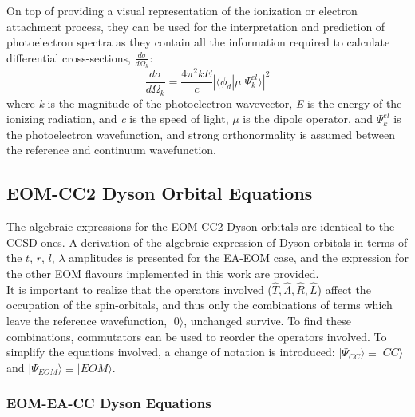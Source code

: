 On top of providing a visual representation of the ionization or electron attachment process, they can be used for the interpretation and prediction of photoelectron spectra as they contain all the information required to calculate differential cross-sections, $\displaystyle{\frac{d\sigma}{d\Omega_k}}$:
\begin{equation}
    \frac{d\sigma}{d\Omega_k} = \frac{4\pi^2kE}{c}|\langle \phi_d | \mu | \Psi^{el}_k \rangle |^2
\end{equation}
where \textit{k} is the magnitude of the photoelectron wavevector, \textit{E} is the energy of the ionizing radiation, and \textit{c} is the speed of light, $\mu$ is the dipole operator, and $\Psi^{el}_k$ is the photoelectron wavefunction, and strong orthonormality is assumed between the reference and continuum wavefunction.  

\subsection{EOM-CC2 Dyson Orbital Equations\label{sec:theory_dyson}}

The algebraic expressions for the EOM-CC2 Dyson orbitals are identical to the CCSD ones. A derivation of the algebraic expression of Dyson orbitals in terms of the $t,\, r,\, l,\, \lambda$ amplitudes is presented for the EA-EOM case, and the expression for the other EOM flavours implemented in this work are provided.\\

It is important to realize that the operators involved ($\hat{T},\hat{\Lambda},\hat{R},\hat{L}$) affect the occupation of the spin-orbitals, and thus only the combinations of terms which leave the reference wavefunction, $| 0 \rangle$, unchanged survive. To find these combinations, commutators can be used to reorder the operators involved. To simplify the equations involved, a change of notation is introduced: $| \Psi_{CC} \rangle \equiv | CC \rangle $ and $| \Psi_{EOM} \rangle \equiv | EOM \rangle $. 

\subsubsection{EOM-EA-CC Dyson Equations}\label{sec:theory_eom_ea_dyson}

